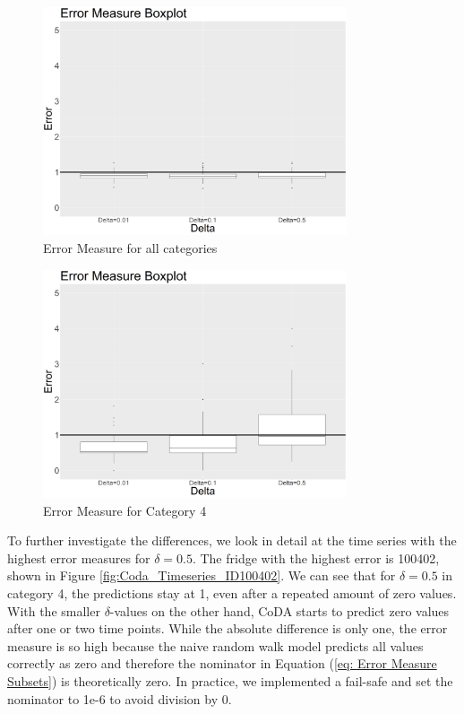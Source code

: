 \begin{figure}[htbp]
	\centering
		\includegraphics[width=0.80\textwidth]{Graphiken/ErrorMeasureCoDA_Box_all__Variation_dL.png}
	\caption{Error Measure for all categories}
	\label{fig:ErrorMeasureCoDA_Box_all__Variation_dL}
\end{figure}

\begin{figure}[htbp]
	\centering
		\includegraphics[width=0.80\textwidth]{Graphiken/ErrorMeasureCoDA_Box_all__Variation_dLcat4.png}
	\caption{Error Measure for Category 4}
	\label{fig:ErrorMeasureCoDA_Box_all__Variation_dLcat4}
\end{figure}



To further investigate the differences, we look in detail at the time series with the highest error measures for $\delta=0.5$. The fridge with the highest error is 100402, shown in Figure \ref{fig:Coda_Timeseries_ID100402}. We can see that for $\delta=0.5$ in category 4, the predictions stay at 1, even after a repeated amount of zero values. With the smaller $\delta$-values on the other hand, CoDA starts to predict zero values after one or two time points. While the absolute difference is only one, the error measure is so high because the naive random walk model predicts all values correctly as zero and therefore the nominator in Equation (\ref{eq: Error Measure Subsets}) is theoretically zero. In practice, we implemented a fail-safe and set the nominator to 1e-6 to avoid division by 0. 


